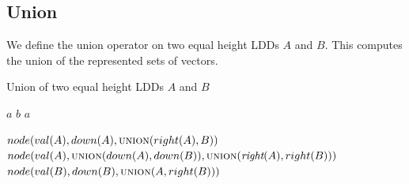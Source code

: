 \documentclass[a4paper]{article}
\newcommand{\var}[1]{\textit{#1}}
\begin{document}
\subsection{Union}

We define the union operator on two equal height LDDs $A$ and $B$.
This computes the union of the represented sets of vectors.

\begin{algorithm}[h]
\caption{Union of two equal height LDDs $\var{A}$ and $\var{B}$}
\begin{algorithmic}[1]
	\State \Return $a$
	\State \Return $b$
	\State \Return $a$
\EndIf

	\State \Return $node(val(A), down(A), \textsc{union}(right(A), B))$
	\State \Return $node(val(A), \textsc{union}(down(A), down(B)), \textsc{union}(\textit{right}(A), right(B)))$
	\State \Return $node(val(B), down(B), \textsc{union}(A, right(B)))$	
\EndIf

\EndFunction
\end{algorithmic}
\end{algorithm}
\end{document}
